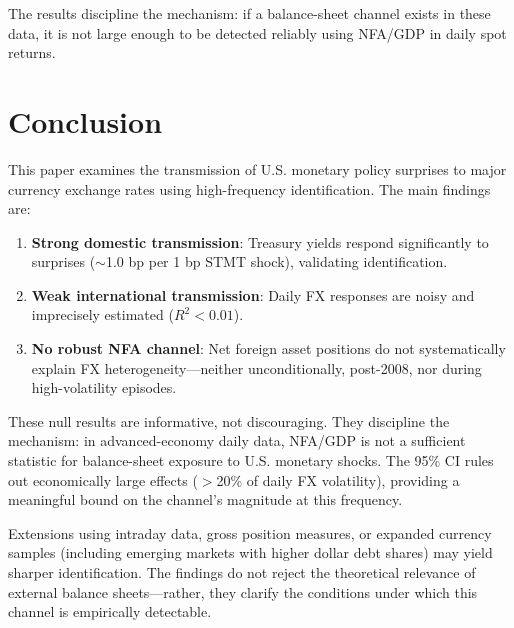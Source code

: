 \documentclass[12pt]{article}
\begin{document}
The results discipline the mechanism: if a balance-sheet channel exists in these data, it is not large enough to be detected reliably using NFA/GDP in daily spot returns.

\section{Conclusion}

This paper examines the transmission of U.S. monetary policy surprises to major currency exchange rates using high-frequency identification. The main findings are:

\begin{enumerate}
    \item \textbf{Strong domestic transmission}: Treasury yields respond significantly to surprises ($\sim$1.0 bp per 1 bp STMT shock), validating identification.
    
    \item \textbf{Weak international transmission}: Daily FX responses are noisy and imprecisely estimated ($R^2 < 0.01$).
    
    \item \textbf{No robust NFA channel}: Net foreign asset positions do not systematically explain FX heterogeneity---neither unconditionally, post-2008, nor during high-volatility episodes.
\end{enumerate}

These null results are informative, not discouraging. They discipline the mechanism: in advanced-economy daily data, NFA/GDP is not a sufficient statistic for balance-sheet exposure to U.S. monetary shocks. The 95\% CI rules out economically large effects ($>$20\% of daily FX volatility), providing a meaningful bound on the channel's magnitude at this frequency.

Extensions using intraday data, gross position measures, or expanded currency samples (including emerging markets with higher dollar debt shares) may yield sharper identification. The findings do not reject the theoretical relevance of external balance sheets---rather, they clarify the conditions under which this channel is empirically detectable.
\end{document}
